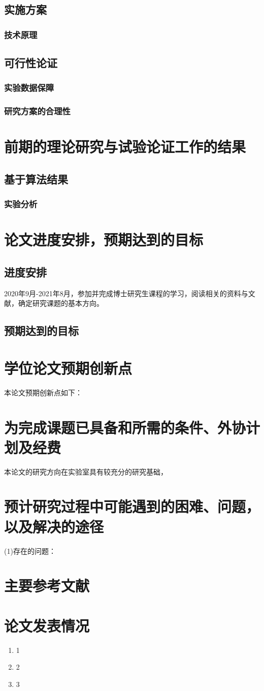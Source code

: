\documentclass[fontset=fandol,toc=true,type=doctor,stage=opening,campus=harbin]{hithesisart}
\begin{document}
\subsection{实施方案}
\subsubsection{技术原理}
\subsection{可行性论证}
\subsubsection{实验数据保障}
\subsubsection{研究方案的合理性}
\section{前期的理论研究与试验论证工作的结果}
\subsection{基于算法结果}
\subsubsection{实验分析}
\section{论文进度安排，预期达到的目标}
\subsection{进度安排}
2020年9月-2021年8月，参加并完成博士研究生课程的学习，阅读相关的资料与文献，确定研究课题的基本方向。
\subsection{预期达到的目标}
\section{学位论文预期创新点}
本论文预期创新点如下：
\section{为完成课题已具备和所需的条件、外协计划及经费}
本论文的研究方向在实验室具有较充分的研究基础，
\section{预计研究过程中可能遇到的困难、问题，以及解决的途径}
\noindent
(1)存在的问题：
\section{主要参考文献}
\section{论文发表情况}
\renewcommand{\labelenumi}{[\arabic{enumi}]}
\begin{enumerate}
  \item 1
  \item 2
  \item 3
\end{enumerate}
\end{document}
